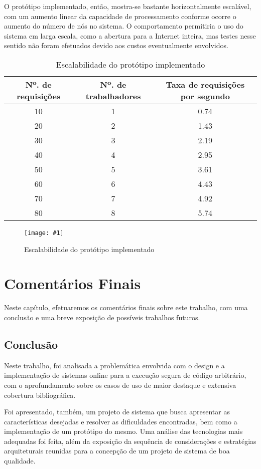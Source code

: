 \documentclass[ruledheader, 12pt]{abnt}
\newcommand{\figcustom}[4]{\par
	\begin{figure}[#3]
		\centering
		\texttt{[image: \#1]}
		\caption{\label{fig:#1}#2}
	\end{figure}
\par}
\begin{document}
O protótipo implementado, então, mostra-se bastante horizontalmente escalável, com um aumento linear da capacidade de processamento conforme ocorre o aumento do número de nós no sistema. O comportamento permitiria o uso do sistema em larga escala, como a abertura para a Internet inteira, mas testes nesse sentido não foram efetuados devido aos custos eventualmente envolvidos.

\begin{table}[p]
	\centering
	\caption{\label{tbl:scale}Escalabilidade do protótipo implementado}
	\begin{tabular}{c c c}\hline
		\hline
		Nº. de requisições & Nº. de trabalhadores & Taxa de requisições por segundo \\\hline
		\hline
		10 & 1 & 0.74 \\\hline
		20 & 2 & 1.43 \\\hline
		30 & 3 & 2.19 \\\hline
		40 & 4 & 2.95 \\\hline
		50 & 5 & 3.61 \\\hline
		60 & 6 & 4.43 \\\hline
		70 & 7 & 4.92 \\\hline
		80 & 8 & 5.74 \\\hline
		\hline
	\end{tabular}
\end{table}

\figcustom{scale}{Escalabilidade do protótipo implementado}{p}{1}

\chapter{Comentários Finais}

Neste capítulo, efetuaremos os comentários finais sobre este trabalho, com uma conclusão e uma breve exposição de possíveis trabalhos futuros.

\section{Conclusão}

Neste trabalho, foi analisada a problemática envolvida com o design e a implementação de sistemas online para a execução segura de código arbitrário, com o aprofundamento sobre os casos de uso de maior destaque e extensiva cobertura bibliográfica.

Foi apresentado, também, um projeto de sistema que busca apresentar as características desejadas e resolver as dificuldades encontradas, bem como a implementação de um protótipo do mesmo. Uma análise das tecnologias mais adequadas foi feita, além da exposição da sequência de considerações e estratégias arquiteturais reunidas para a concepção de um projeto de sistema de boa qualidade.
\end{document}
